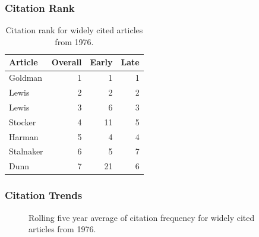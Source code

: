 \documentclass[
  10pt,
  letterpaper,
  DIV=11,
  numbers=noendperiod,
  twoside]{scrartcl}
\begin{document}
\subsubsection*{Citation Rank}\label{sec-rank-1976}

\begin{longtable}[]{@{}lrrr@{}}

\caption{\label{tbl-citation-rank-1976}Citation rank for widely cited
articles from 1976.}

\tabularnewline

\toprule\noalign{}
Article & Overall & Early & Late \\
\midrule\noalign{}
\endhead
\bottomrule\noalign{}
\endlastfoot
Goldman & 1 & 1 & 1 \\
Lewis & 2 & 2 & 2 \\
Lewis & 3 & 6 & 3 \\
Stocker & 4 & 11 & 5 \\
Harman & 5 & 4 & 4 \\
Stalnaker & 6 & 5 & 7 \\
Dunn & 7 & 21 & 6 \\

\end{longtable}

\subsubsection*{Citation Trends}\label{sec-trends-1976}

\begin{figure}


\caption{\label{fig-citation-spaghetti-1976}Rolling five year average of
citation frequency for widely cited articles from 1976.}

\end{figure}%
\end{document}
